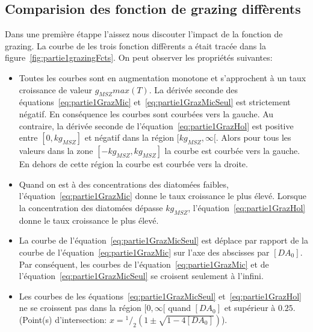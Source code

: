 {\subsection{Comparision des fonction de grazing diffèrents}

\par{
Dans une première étappe l'aissez nous discouter l'impact de la fonction de grazing. La courbe de les
trois fonction diffèrents a était tracée dans la figure~\ref{fig:partie1grazingFcts}.
On peut observer les propriétés suivantes:
}
\begin{itemize}
  \item Toutes les courbes sont en augmentation monotone et s'approchent à un taux croissance de valeur
$g_{MSZ} max(T)$. La dérivée seconde des équations~\ref{eq:partie1GrazMic} et~\ref{eq:partie1GrazMicSeul}
est strictement négatif. En conséquence les courbes sont courbées vers la gauche. Au contraire, la
dérivée seconde de l'équation~\ref{eq:partie1GrazHol} est positive entre $[0, kg_{MSZ}]$
et négatif dans la région $[kg_{MSZ}, \infty[$. Alors pour tous les valeurs dans la zone $[-kg_{MSZ},kg_{MSZ}]$
la courbe est courbée vers la gauche. En dehors de cette région la courbe est courbée vers la droite.
  \item Quand on est à des concentrations des diatomées faibles, l'équation~\ref{eq:partie1GrazMic}
donne le taux croissance le plus élevé. Lorsque la concentration des diatomées dépasse $kg_{MSZ}$,
l'équation~\ref{eq:partie1GrazHol} donne le taux croissance le plus élevé.
  \item La courbe de l'équation~\ref{eq:partie1GrazMicSeul} est déplace par rapport de la
courbe de l'équation~\ref{eq:partie1GrazMic} sur l'axe des abscisses par $[DA_0]$. Par conséquent,
les courbes de l'équation~\ref{eq:partie1GrazMic} et de l'équation~\ref{eq:partie1GrazMicSeul}
se croisent seulement à l'infini.
  \item Les courbes de les équations~\ref{eq:partie1GrazMicSeul} et~\ref{eq:partie1GrazHol}
ne se croissent pas dans la région $[0, \infty[$ quand $[DA_0]$ et supérieur à $0.25$.
(Point(s) d'intersection: $x = {^1/_2} \left ( 1 \pm \sqrt{1 - 4 [DA_0]}\right )$).
\end{itemize}

}
